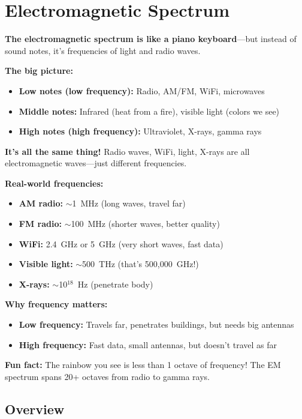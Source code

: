 \chapter{Electromagnetic Spectrum}
\label{ch:emspectrum}

\begin{nontechnical}
\textbf{The electromagnetic spectrum is like a piano keyboard}---but instead of sound notes, it's frequencies of light and radio waves.

\textbf{The big picture:}
\begin{itemize}
\item \textbf{Low notes (low frequency):} Radio, AM/FM, WiFi, microwaves
\item \textbf{Middle notes:} Infrared (heat from a fire), visible light (colors we see)
\item \textbf{High notes (high frequency):} Ultraviolet, X-rays, gamma rays
\end{itemize}

\textbf{It's all the same thing!} Radio waves, WiFi, light, X-rays are all electromagnetic waves---just different frequencies.

\textbf{Real-world frequencies:}
\begin{itemize}
\item \textbf{AM radio:} $\sim$1~MHz (long waves, travel far)
\item \textbf{FM radio:} $\sim$100~MHz (shorter waves, better quality)
\item \textbf{WiFi:} 2.4~GHz or 5~GHz (very short waves, fast data)
\item \textbf{Visible light:} $\sim$500~THz (that's 500,000~GHz!)
\item \textbf{X-rays:} $\sim$10$^{18}$~Hz (penetrate body)
\end{itemize}

\textbf{Why frequency matters:}
\begin{itemize}
\item \textbf{Low frequency:} Travels far, penetrates buildings, but needs big antennas
\item \textbf{High frequency:} Fast data, small antennas, but doesn't travel as far
\end{itemize}

\textbf{Fun fact:} The rainbow you see is less than 1 octave of frequency! The EM spectrum spans 20+ octaves from radio to gamma rays.
\end{nontechnical}

\section{Overview}

